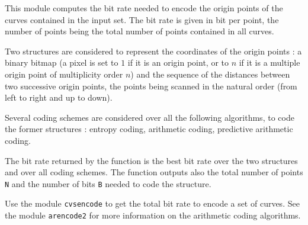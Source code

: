 This module computes the bit rate needed to encode
the origin points of the curves contained in the input set.
The bit rate is given in bit per point, the number of points being
the total number of points contained in all curves.

Two structures are considered to represent the coordinates of the
origin points : a binary bitmap (a pixel is set to $1$ if it is
an origin point, or to $n$ if it is a multiple origin point of multiplicity 
order $n$) and the sequence of the distances between two successive
origin points, the points being scanned in the natural order (from left
to right and up to down).

Several coding schemes are considered over all the following algorithms,
to code the former structures :
entropy coding, arithmetic coding, predictive arithmetic coding.

The bit rate returned by the function is the best bit rate over the
two structures and over all coding schemes.
The function outputs also the total number of points \verb+N+
and the number of bits \verb+B+ needed to code the structure.

Use the module \verb+cvsencode+ to get the total bit rate to encode
a set of curves.
See the module \verb+arencode2+ for more information on the arithmetic
coding algorithms.
